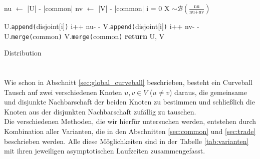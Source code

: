 

\begin{algorithm}
\begin{algorithmic}[1]
	\State nu $\gets$ |U| - |common| 
	\State nv $\gets$ |V| - |common| 
	\State i = 0
		\State X $\sim \mathcal{B}(\frac{\text{nu}}{\text{nu}+\text{nv}})$  

			\State U.\texttt{append(}disjoint[i]\texttt{)} 
			\State i++
			\State nu- - 
		\Else{} 
			\State V.\texttt{append(}disjoint[i]\texttt{)}
			\State i++
			\State nv- -
		\EndIf{}
	\EndWhile{}	
	\State U.\texttt{merge(}common\texttt{)} 
	\State V.\texttt{merge(}common\texttt{)} 
	\State \textbf{return} U, V
\EndProcedure
\end{algorithmic}
	\caption{Distribution}
	\label{algo:distr}
\end{algorithm}







\section{\ct}
Wie schon in Abschnitt \ref{sec:global_curveball} beschrieben, 
besteht ein Curveball Tausch auf zwei verschiedenen Knoten $u, v \in V$  ($u\neq v$) daraus, die 
gemeinsame und disjunkte Nachbarschaft der beiden Knoten zu bestimmen
und schließlich die Knoten aus der disjunkten Nachbarschaft zufällig zu tauschen.
\\
Die verschiedenen Methoden, die wir hierfür untersuchen werden, 
entstehen durch Kombination aller Varianten, die in den Abschnitten \ref{sec:common} und \ref{sec:trade} beschrieben 
werden. Alle diese Möglichkeiten sind in der Tabelle \ref{tab:varianten} mit ihren jeweiligen asymptotischen
Laufzeiten zusammengefasst.


